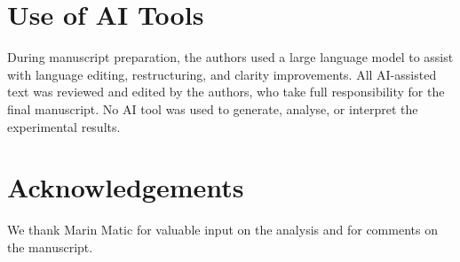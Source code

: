 \documentclass[11pt,a4paper]{article}
\begin{document}
\section*{Use of AI Tools}

During manuscript preparation, the authors used a large language model to assist
with language editing, restructuring, and clarity improvements. All AI-assisted
text was reviewed and edited by the authors, who take full responsibility for the
final manuscript. No AI tool was used to generate, analyse, or interpret the
experimental results.

\section*{Acknowledgements}

We thank Marin Matic for valuable input on the analysis and for comments on the manuscript.



\end{document}
